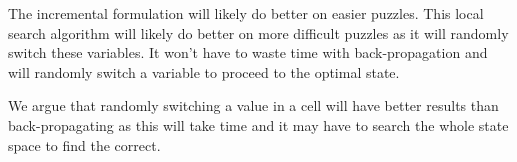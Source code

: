 The incremental formulation will likely do better on easier puzzles. This local search algorithm will likely do better on more difficult puzzles as it will randomly switch these variables. It won't have to waste time with back-propagation and will randomly switch a variable to proceed to the optimal state.

We argue that randomly switching a value in a cell will have better results than back-propagating as this will take time and it may have to search the whole state space to find the correct.